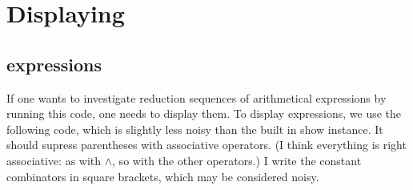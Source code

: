 \documentclass{article}
\begin{document}
\section{Displaying}

\subsection{expressions} 
    
If one wants to investigate reduction sequences of arithmetical
expressions by running this code, one needs to display them.
To display expressions, we use the following code,
which is slightly less noisy than the built in show instance.
It should supress parentheses with associative operators.
(I think everything is right associative: as with \ensuremath{\wedge}, so
with the other operators.)
I write the constant combinators in square brackets, which may
be considered noisy.
\end{document}
